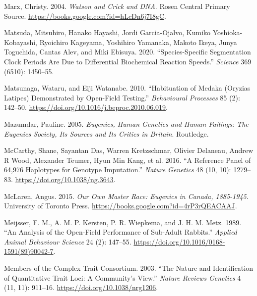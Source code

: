 \documentclass[
]{book}
\newlength{\cslhangindent}
\newlength{\cslentryspacingunit} %
\newenvironment{CSLReferences}[2] %
 {%
  \setlength{\parindent}{0pt}
  \ifodd #1
  \let\oldpar\par
  \def\par{\hangindent=\cslhangindent\oldpar}
  \fi
  \setlength{\parskip}{#2\cslentryspacingunit}
 }%
 {}
\begin{document}
\begin{CSLReferences}{1}{0}
\leavevmode{}%
Marx, Christy. 2004. \emph{Watson and {Crick} and {DNA}}. {Rosen Central Primary Source}. \url{https://books.google.com?id=hLcDn6j7I8gC}.

\leavevmode{}%
Matsuda, Mitsuhiro, Hanako Hayashi, Jordi Garcia-Ojalvo, Kumiko Yoshioka-Kobayashi, Ryoichiro Kageyama, Yoshihiro Yamanaka, Makoto Ikeya, Junya Toguchida, Cantas Alev, and Miki Ebisuya. 2020. {``Species-Specific Segmentation Clock Periods Are Due to Differential Biochemical Reaction Speeds.''} \emph{Science} 369 (6510): 1450--55.

\leavevmode{}%
Matsunaga, Wataru, and Eiji Watanabe. 2010. {``Habituation of Medaka ({Oryzias} Latipes) Demonstrated by Open-Field Testing.''} \emph{Behavioural Processes} 85 (2): 142--50. \url{https://doi.org/10.1016/j.beproc.2010.06.019}.

\leavevmode{}%
Mazumdar, Pauline. 2005. \emph{Eugenics, Human Genetics and Human Failings: The {Eugenics Society}, Its Sources and Its Critics in {Britain}}. {Routledge}.

\leavevmode{}%
McCarthy, Shane, Sayantan Das, Warren Kretzschmar, Olivier Delaneau, Andrew R Wood, Alexander Teumer, Hyun Min Kang, et al. 2016. {``A Reference Panel of 64,976 Haplotypes for Genotype Imputation.''} \emph{Nature Genetics} 48 (10, 10): 1279--83. \url{https://doi.org/10.1038/ng.3643}.

\leavevmode{}%
McLaren, Angus. 2015. \emph{Our {Own Master Race}: {Eugenics} in {Canada}, 1885-1945}. {University of Toronto Press}. \url{https://books.google.com?id=4rP3rQEACAAJ}.

\leavevmode{}%
Meijsser, F. M., A. M. P. Kersten, P. R. Wiepkema, and J. H. M. Metz. 1989. {``An Analysis of the Open-Field Performance of Sub-Adult Rabbits.''} \emph{Applied Animal Behaviour Science} 24 (2): 147--55. \url{https://doi.org/10.1016/0168-1591(89)90042-7}.

\leavevmode{}%
Members of the Complex Trait Consortium. 2003. {``The Nature and Identification of Quantitative Trait Loci: A Community's View.''} \emph{Nature Reviews Genetics} 4 (11, 11): 911--16. \url{https://doi.org/10.1038/nrg1206}.


\end{CSLReferences}
\end{document}
